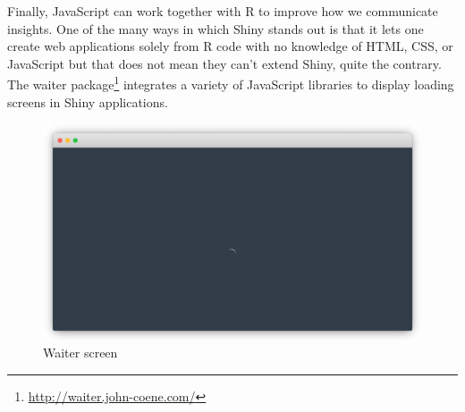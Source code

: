 \documentclass[
]{krantz}
\makeatletter
\newenvironment{Shaded}{\begin{snugshade}}{\end{snugshade}}
\newcommand{\CommentTok}[1]{\textcolor[rgb]{0.37,0.37,0.37}{\textit{#1}}}
\newcommand{\ControlFlowTok}[1]{\textcolor[rgb]{0.27,0.27,0.27}{\textbf{#1}}}
\newcommand{\DecValTok}[1]{\textcolor[rgb]{0.06,0.06,0.06}{#1}}
\newcommand{\KeywordTok}[1]{\textcolor[rgb]{0.27,0.27,0.27}{\textbf{#1}}}
\newcommand{\NormalTok}[1]{#1}
\newcommand{\OperatorTok}[1]{\textcolor[rgb]{0.43,0.43,0.43}{\textbf{#1}}}
\newcommand{\StringTok}[1]{\textcolor[rgb]{0.5,0.5,0.5}{#1}}
\renewcommand{\href}[2]{#2\footnote{\url{#1}}}
\newenvironment{kframe}{%
\medskip{}
\setlength{\fboxsep}{.8em}
 \def\at@end@of@kframe{}%
 \ifinner\ifhmode%
  \def\at@end@of@kframe{\end{minipage}}%
  \begin{minipage}{\columnwidth}%
 \fi\fi%
 \def\FrameCommand##1{\hskip\@totalleftmargin \hskip-\fboxsep
 \colorbox{shadecolor}{##1}\hskip-\fboxsep
     \hskip-\linewidth \hskip-\@totalleftmargin \hskip\columnwidth}%
 \MakeFramed {\advance\hsize-\width
   \@totalleftmargin\z@ \linewidth\hsize
   \@setminipage}}%
 {\par\unskip\endMakeFramed%
 \at@end@of@kframe}
\renewenvironment{Shaded}{\begin{kframe}}{\end{kframe}}
\makeatother
\begin{document}
Finally, JavaScript can work together with R to improve how we communicate insights. One of the many ways in which Shiny stands out is that it lets one create web applications solely from R code with no knowledge of HTML, CSS, or JavaScript but that does not mean they can't extend Shiny, quite the contrary. The \href{http://waiter.john-coene.com/}{waiter package} \citep{R-waiter} integrates a variety of JavaScript libraries to display loading screens in Shiny applications.

\begin{Shaded}
\end{Shaded}

\begin{figure}[t]

{\centering \includegraphics[width=1\linewidth]{images/waiter} 

}

\caption{Waiter screen}\label{fig:intro-waiter}
\end{figure}
\end{document}
